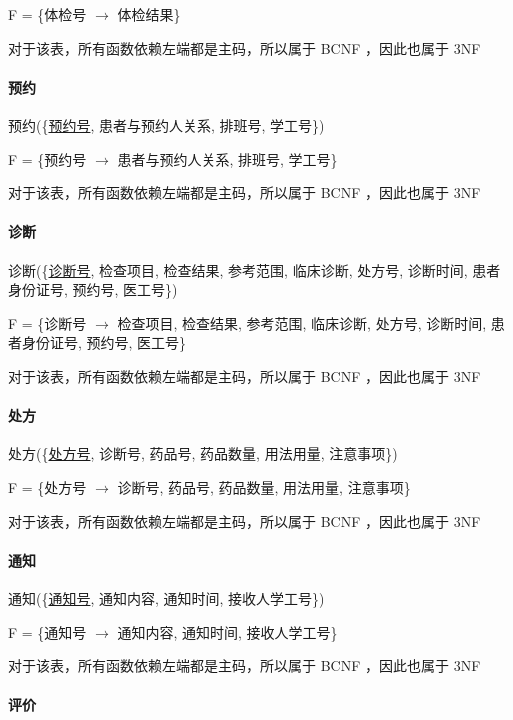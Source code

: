 \documentclass{article}
\begin{document}
F = \{体检号 $\rightarrow$ 体检结果\}

对于该表，所有函数依赖左端都是主码，所以属于 BCNF ，因此也属于 3NF

\paragraph{预约}

预约(\{\underline{预约号}, 患者与预约人关系, 排班号, 学工号\})

F = \{预约号 $\rightarrow$ 患者与预约人关系, 排班号, 学工号\}

对于该表，所有函数依赖左端都是主码，所以属于 BCNF ，因此也属于 3NF

\paragraph{诊断}

诊断(\{\underline{诊断号}, 检查项目, 检查结果, 参考范围, 临床诊断, 处方号, 诊断时间, 患者身份证号, 预约号, 医工号\})

F = \{诊断号 $\rightarrow$ 检查项目, 检查结果, 参考范围, 临床诊断, 处方号, 诊断时间, 患者身份证号, 预约号, 医工号\}

对于该表，所有函数依赖左端都是主码，所以属于 BCNF ，因此也属于 3NF

\paragraph{处方}

处方(\{\underline{处方号}, 诊断号, 药品号, 药品数量, 用法用量, 注意事项\})

F = \{处方号 $\rightarrow$ 诊断号, 药品号, 药品数量, 用法用量, 注意事项\}

对于该表，所有函数依赖左端都是主码，所以属于 BCNF ，因此也属于 3NF

\paragraph{通知}

通知(\{\underline{通知号}, 通知内容, 通知时间, 接收人学工号\})

F = \{通知号 $\rightarrow$ 通知内容, 通知时间, 接收人学工号\}

对于该表，所有函数依赖左端都是主码，所以属于 BCNF ，因此也属于 3NF

\paragraph{评价}
\end{document}

